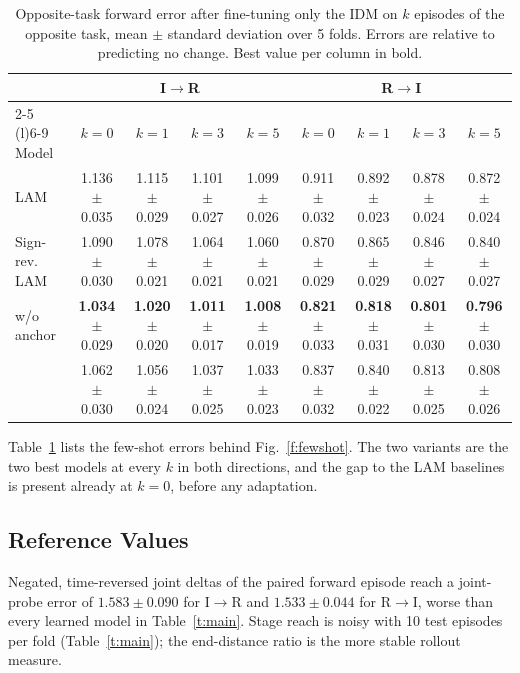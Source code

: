 \begin{table}
	\centering
	\caption{Opposite-task forward error after fine-tuning only the IDM on $k$ episodes of the opposite task, mean $\pm$ standard deviation over 5 folds. Errors are relative to predicting no change. Best value per column in bold.}
	\label{t:fewshot}
	\footnotesize
	\setlength{\tabcolsep}{4pt}
	\begin{tabular}{lcccccccc}
		\toprule
		& \multicolumn{4}{c}{I$\to$R} & \multicolumn{4}{c}{R$\to$I} \\
		\cmidrule(r){2-5} \cmidrule(l){6-9}
		Model & $k=0$ & $k=1$ & $k=3$ & $k=5$ & $k=0$ & $k=1$ & $k=3$ & $k=5$ \\
		\midrule
		LAM & 1.136$\pm$0.035 & 1.115$\pm$0.029 & 1.101$\pm$0.027 & 1.099$\pm$0.026 & 0.911$\pm$0.032 & 0.892$\pm$0.023 & 0.878$\pm$0.024 & 0.872$\pm$0.024 \\
		Sign-rev. LAM & 1.090$\pm$0.030 & 1.078$\pm$0.021 & 1.064$\pm$0.021 & 1.060$\pm$0.021 & 0.870$\pm$0.029 & 0.865$\pm$0.029 & 0.846$\pm$0.027 & 0.840$\pm$0.027 \\
		{\method} w/o anchor & \textbf{1.034}$\pm$0.029 & \textbf{1.020}$\pm$0.020 & \textbf{1.011}$\pm$0.017 & \textbf{1.008}$\pm$0.019 & \textbf{0.821}$\pm$0.033 & \textbf{0.818}$\pm$0.031 & \textbf{0.801}$\pm$0.030 & \textbf{0.796}$\pm$0.030 \\
		{\method} & 1.062$\pm$0.030 & 1.056$\pm$0.024 & 1.037$\pm$0.025 & 1.033$\pm$0.023 & 0.837$\pm$0.032 & 0.840$\pm$0.022 & 0.813$\pm$0.025 & 0.808$\pm$0.026 \\
		\bottomrule
	\end{tabular}
\end{table}

Table~\ref{t:fewshot} lists the few-shot errors behind Fig.~\ref{f:fewshot}.
The two {\method} variants are the two best models at every $k$ in both directions, and the gap to the LAM baselines is present already at $k=0$, before any adaptation.

\subsection{Reference Values}
Negated, time-reversed joint deltas of the paired forward episode reach a joint-probe error of $1.583\pm0.090$ for I$\to$R and $1.533\pm0.044$ for R$\to$I, worse than every learned model in Table~\ref{t:main}.
Stage reach is noisy with 10 test episodes per fold (Table~\ref{t:main}); the end-distance ratio is the more stable rollout measure.


